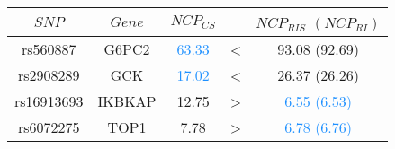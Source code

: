 \begin{table}[ht]
\centering
\begin{tabular}{ccccc}
  \hline
$SNP$ & $Gene$ & $NCP_{CS}$ &  & $NCP_{RIS}$ $(NCP_{RI})$ \\ 
  \hline
rs560887 & G6PC2 & \textcolor{dodgerblue}{63.33} & \textcolor{maroon2}{\LARGE <} & \textcolor{firebrick2}{93.08 (92.69)} \\ 
  rs2908289 & GCK & \textcolor{dodgerblue}{17.02} & \textcolor{maroon2}{\LARGE <} & \textcolor{firebrick2}{26.37 (26.26)} \\ 
  rs16913693 & IKBKAP & \textcolor{firebrick2}{12.75} & \textcolor{maroon2}{\LARGE >} & \textcolor{dodgerblue}{6.55 (6.53)} \\ 
  rs6072275 & TOP1 & \textcolor{firebrick2}{7.78} & \textcolor{maroon2}{\LARGE >} & \textcolor{dodgerblue}{6.78 (6.76)} \\ 
   \hline
\end{tabular}
\label{tab:NCP}
\end{table}
